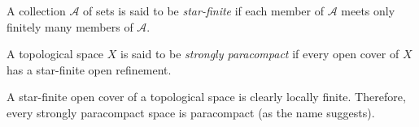 \documentclass[12pt]{article}
\begin{document}

A collection $\mathcal{A}$ of sets is said to be \emph{star-finite}
if each member of $\mathcal{A}$ 
meets only finitely many members of $\mathcal{A}$.

A topological space $X$ is said to be \emph{strongly paracompact}
if every open cover of $X$ has a star-finite open refinement.

A star-finite open cover of a topological space
is clearly locally finite.
Therefore, every strongly paracompact space is paracompact
(as the name suggests).

\end{document}
